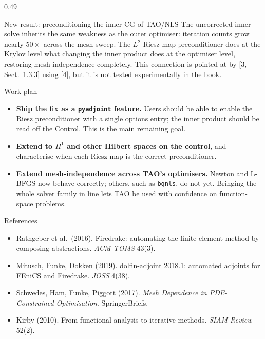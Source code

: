 \documentclass[final]{beamer}
\begin{document}
\begin{frame}[t]
\begin{columns}[t,totalwidth=\dimexpr\paperwidth-3cm\relax]
\begin{column}{0.49\dimexpr\paperwidth-3cm\relax}
\begin{alertblock}{New result: preconditioning the inner CG of TAO/NLS}
\vspace{0.2em}
\justifying\small
The uncorrected inner solve inherits the same weakness as the outer optimiser: iteration counts grow nearly $50\times$ across the mesh sweep. The $L^{2}$ Riesz-map preconditioner does at the Krylov level what changing the inner product does at the optimiser level, restoring mesh-independence completely. This connection is pointed at by [3, Sect.~1.3.3] using [4], but it is not tested experimentally in the book.
\end{alertblock}

\begin{block}{Work plan}
\begin{itemize}
\item \textbf{Ship the fix as a \texttt{pyadjoint} feature.} Users should be able to enable the Riesz preconditioner with a single options entry; the inner product should be read off the Control. This is the main remaining goal.
\item \textbf{Extend to $H^{1}$ and other Hilbert spaces on the control}, and characterise when each Riesz map is the correct preconditioner.
\item \textbf{Extend mesh-independence across TAO's optimisers.} Newton and L-BFGS now behave correctly; others, such as \texttt{bqnls}, do not yet. Bringing the whole solver family in line lets TAO be used with confidence on function-space problems.
\end{itemize}
\end{block}

\begin{block}{References}
\footnotesize
\begin{itemize}\itemsep0.1em
\item[{[1]}] Rathgeber et al.\ (2016). Firedrake: automating the finite element method by composing abstractions. \textit{ACM TOMS} 43(3).
\item[{[2]}] Mitusch, Funke, Dokken (2019). dolfin-adjoint 2018.1: automated adjoints for FEniCS and Firedrake. \textit{JOSS} 4(38).
\item[{[3]}] Schwedes, Ham, Funke, Piggott (2017). \textit{Mesh Dependence in PDE-Constrained Optimisation}. SpringerBriefs.
\item[{[4]}] Kirby (2010). From functional analysis to iterative methods. \textit{SIAM Review} 52(2).
\end{itemize}
\end{block}

\end{column}


\end{columns}
\end{frame}
\end{document}
